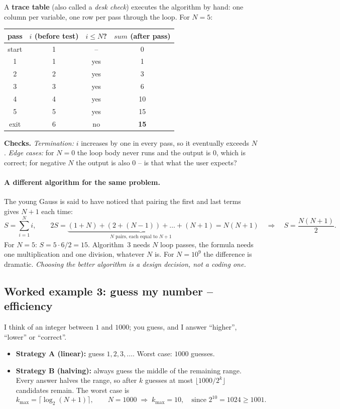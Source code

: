 \documentclass[11pt,a4paper]{article}
\newcommand{\term}[1]{\textbf{\color{ink}#1}}
\begin{document}
A \term{trace table} (also called a \emph{desk check}) executes the algorithm by hand: one column per variable, one row per pass through the loop. For $N=5$:
\begin{center}\small
\begin{tabular}{cccc}
\toprule
pass & $i$ (before test) & $i\le N$? & $sum$ (after pass)\\ \midrule
start & 1 & -- & 0\\
1 & 1 & yes & 1\\
2 & 2 & yes & 3\\
3 & 3 & yes & 6\\
4 & 4 & yes & 10\\
5 & 5 & yes & 15\\
exit & 6 & \textcolor{errc}{no} & \textbf{15}\\ \bottomrule
\end{tabular}
\end{center}
\textbf{Checks.} \emph{Termination:} $i$ increases by one in every pass, so it eventually exceeds $N$. \emph{Edge cases:} for $N=0$ the loop body never runs and the output is $0$, which is correct; for negative $N$ the output is also $0$ -- is that what the user expects?

\paragraph{A different algorithm for the same problem.} The young Gauss is said to have noticed that pairing the first and last terms gives $N+1$ each time:
\begin{equation}
S = \sum_{i=1}^{N} i, \qquad 2S = \underbrace{(1+N) + (2+(N-1)) + \dots + (N+1)}_{N \text{ pairs, each equal to } N+1} = N(N+1)
\quad\Longrightarrow\quad S = \frac{N(N+1)}{2}.
\end{equation}
For $N=5$: $S = 5\cdot 6/2 = 15$. Algorithm~3 needs $N$ loop passes, the formula needs one multiplication and one division, whatever $N$ is. For $N=10^{9}$ the difference is dramatic. \emph{Choosing the better algorithm is a design decision, not a coding one.}

\subsection{Worked example 3: guess my number -- efficiency}
I think of an integer between $1$ and $1000$; you guess, and I answer ``higher'', ``lower'' or ``correct''.
\begin{itemize}[leftmargin=*,itemsep=0pt]
  \item \textbf{Strategy A (linear):} guess $1, 2, 3, \dots$. Worst case: $1000$ guesses.
  \item \textbf{Strategy B (halving):} always guess the middle of the remaining range. Every answer halves the range, so after $k$ guesses at most $\lfloor 1000/2^{k}\rfloor$ candidates remain. The worst case is
  \begin{equation}
  k_{\max} = \lceil \log_2 (N+1) \rceil, \qquad N = 1000 \;\Rightarrow\; k_{\max} = 10, \quad\text{since } 2^{10}=1024 \ge 1001 .
  \end{equation}
\end{itemize}
\end{document}
